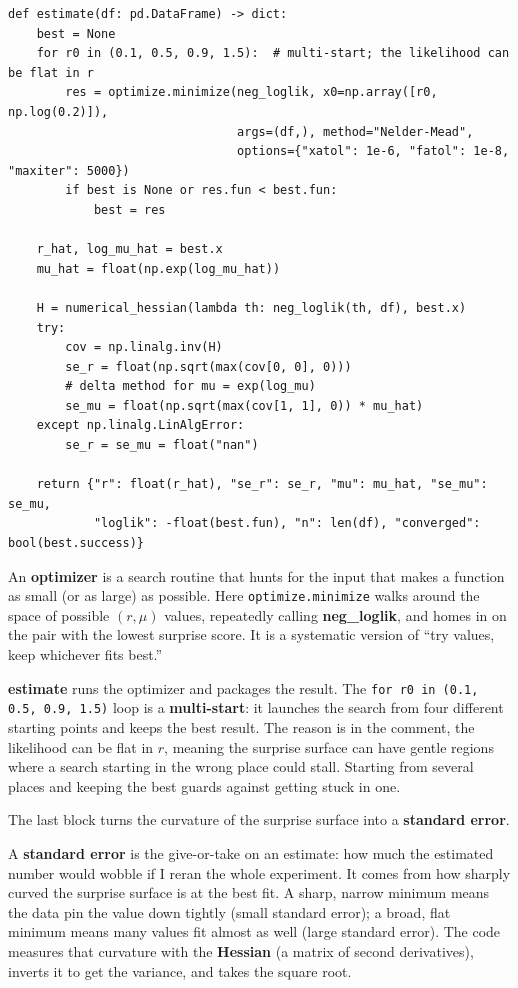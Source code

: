 \documentclass[11pt]{article}
\newcommand{\term}[1]{\textbf{\color{mossdk}#1}}
\newcommand{\file}[1]{\textbf{\ttfamily #1}}
\begin{document}
\begin{lstlisting}[style=py,firstnumber=70]
def estimate(df: pd.DataFrame) -> dict:
    best = None
    for r0 in (0.1, 0.5, 0.9, 1.5):  # multi-start; the likelihood can be flat in r
        res = optimize.minimize(neg_loglik, x0=np.array([r0, np.log(0.2)]),
                                args=(df,), method="Nelder-Mead",
                                options={"xatol": 1e-6, "fatol": 1e-8, "maxiter": 5000})
        if best is None or res.fun < best.fun:
            best = res

    r_hat, log_mu_hat = best.x
    mu_hat = float(np.exp(log_mu_hat))

    H = numerical_hessian(lambda th: neg_loglik(th, df), best.x)
    try:
        cov = np.linalg.inv(H)
        se_r = float(np.sqrt(max(cov[0, 0], 0)))
        # delta method for mu = exp(log_mu)
        se_mu = float(np.sqrt(max(cov[1, 1], 0)) * mu_hat)
    except np.linalg.LinAlgError:
        se_r = se_mu = float("nan")

    return {"r": float(r_hat), "se_r": se_r, "mu": mu_hat, "se_mu": se_mu,
            "loglik": -float(best.fun), "n": len(df), "converged": bool(best.success)}
\end{lstlisting}

\begin{defbox}[Optimizer]
An \term{optimizer} is a search routine that hunts for the input that makes a function as small (or as
large) as possible. Here \verb|optimize.minimize| walks around the space of possible $(r, \mu)$ values,
repeatedly calling \file{neg\_loglik}, and homes in on the pair with the lowest surprise score. It is
a systematic version of ``try values, keep whichever fits best.''
\end{defbox}

\file{estimate} runs the optimizer and packages the result. The \verb|for r0 in (0.1, 0.5, 0.9, 1.5)|
loop is a \term{multi-start}: it launches the search from four different starting points and keeps the
best result. The reason is in the comment, the likelihood can be flat in $r$, meaning the surprise
surface can have gentle regions where a search starting in the wrong place could stall. Starting from
several places and keeping the best guards against getting stuck in one.

The last block turns the curvature of the surprise surface into a \term{standard error}.

\begin{defbox}
A \term{standard error} is the give-or-take on an estimate: how much the estimated number would wobble
if I reran the whole experiment. It comes from how sharply curved the surprise surface is at the best
fit. A sharp, narrow minimum means the data pin the value down tightly (small standard error); a broad,
flat minimum means many values fit almost as well (large standard error). The code measures that
curvature with the \term{Hessian} (a matrix of second derivatives), inverts it to get the variance,
and takes the square root.
\end{defbox}
\end{document}
